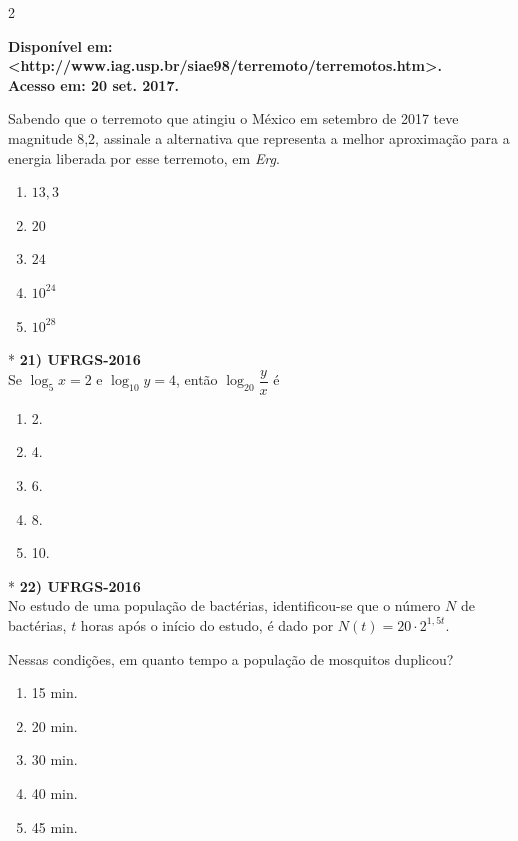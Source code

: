 \documentclass[11pt,a4paper]{article}
\begin{document}
\begin{paracol}{2}
\begin{flushright}
\footnotesize
\textbf{Disponível em: <http://www.iag.usp.br/siae98/terremoto/terremotos.htm>.} \\
\textbf{Acesso em: 20 set. 2017.}
\end{flushright}
\vspace{0.2cm}

Sabendo que o terremoto que atingiu o México em setembro de 2017 teve magnitude 8,2, assinale a alternativa que representa a melhor aproximação para a energia liberada por esse terremoto, em \textit{Erg}.

\begin{enumerate}[label=(\Alph*), itemsep=0.2cm]
    \item $13{,}3$
    \item $20$
    \item $24$
    \item $10^{24}$
    \item $10^{28}$
\end{enumerate}
\vspace{0.4cm}

\switchcolumn[1]
\vspace{12cm}

\switchcolumn[0]*
\textbf{21) UFRGS-2016} \\
Se $\log_5 x = 2$ e $\log_{10} y = 4$, então $\log_{20} \dfrac{y}{x}$ é

\begin{enumerate}[label=(\Alph*)]
    \item 2.
    \item 4.
    \item 6.
    \item 8.
    \item 10.
\end{enumerate}
\vspace{0.4cm}

\switchcolumn[1]
\vspace{6cm}

\switchcolumn[0]*
\textbf{22) UFRGS-2016} \\
No estudo de uma população de bactérias, identificou-se que o número $N$ de bactérias, $t$ horas após o início do estudo, é dado por $N(t) = 20 \cdot 2^{1{,}5t}$.

Nessas condições, em quanto tempo a população de mosquitos duplicou?

\begin{enumerate}[label=(\Alph*)]
    \item 15 min.
    \item 20 min.
    \item 30 min.
    \item 40 min.
    \item 45 min.
\end{enumerate}
\vspace{0.4cm}


\end{paracol}
\end{document}
